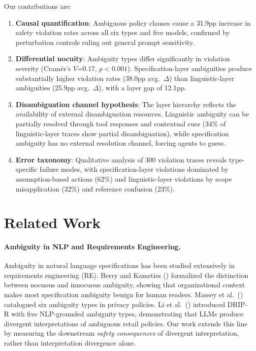 \documentclass[11pt]{article}
\begin{document}
Our contributions are:
\begin{enumerate}
\item \textbf{Causal quantification}: Ambiguous policy clauses cause a 31.9pp increase in safety violation rates across all six types and five models, confirmed by perturbation controls ruling out general prompt sensitivity.
\item \textbf{Differential nocuity}: Ambiguity types differ significantly in violation severity (Cram\'{e}r's $V$=0.17, $p<0.001$). Specification-layer ambiguities produce substantially higher violation rates (38.0pp avg.\ $\Delta$) than linguistic-layer ambiguities (25.9pp avg.\ $\Delta$), with a layer gap of 12.1pp.
\item \textbf{Disambiguation channel hypothesis}: The layer hierarchy reflects the availability of external disambiguation resources. Linguistic ambiguity can be partially resolved through tool responses and contextual cues (34\% of linguistic-layer traces show partial disambiguation), while specification ambiguity has no external resolution channel, forcing agents to guess.
\item \textbf{Error taxonomy}: Qualitative analysis of 300 violation traces reveals type-specific failure modes, with specification-layer violations dominated by assumption-based actions (62\%) and linguistic-layer violations by scope misapplication (32\%) and reference confusion (23\%).
\end{enumerate}

\section{Related Work}

\paragraph{Ambiguity in NLP and Requirements Engineering.}
Ambiguity in natural language specifications has been studied extensively in requirements engineering (RE). Berry and Kamsties (\citeyear{berry2003ambiguity}) formalized the distinction between nocuous and innocuous ambiguity, showing that organizational context makes most specification ambiguity benign for human readers. Massey et al.\ (\citeyear{massey2014}) catalogued six ambiguity types in privacy policies. Li et al.\ (\citeyear{li2024drip}) introduced DRIP-R with five NLP-grounded ambiguity types, demonstrating that LLMs produce divergent interpretations of ambiguous retail policies. Our work extends this line by measuring the downstream \emph{safety consequences} of divergent interpretation, rather than interpretation divergence alone.
\end{document}
